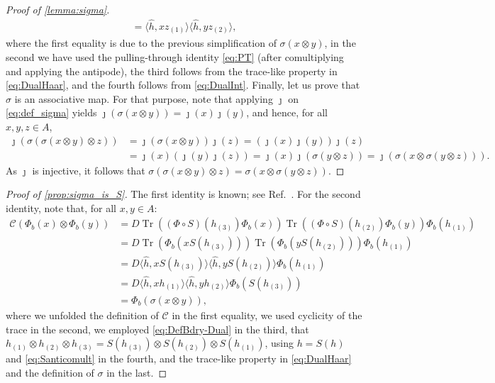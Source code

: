 \documentclass[a4paper,10pt]{amsart}
\newcommand{\Coarse}{\mathcal{C}}
\newcommand{\eval}[2]{\langle #1 , #2\rangle}
\theoremstyle{definition}
\begin{document}
\begin{proof}[Proof of \cref{lemma:sigma}]
\begin{align*}
    =
    \eval{\hat{h}}{x z_{(1)}}
    \eval{\hat{h}}{y z_{(2)}},
\end{align*}
where the first equality is due to the previous simplification of $\sigma(x\otimes y)$, in the second we have used the pulling-through identity \cref{eq:PT} (after comultiplying and applying the antipode), the third follows from the trace-like property in \cref{eq:DualHaar}, and the fourth follows from \cref{eq:DualInt}.
\smallbreak\noindent%
Finally, let us prove that $\sigma$ is an associative map. For that purpose, note that applying $\jmath$ on \cref{eq:def_sigma} yields
$
    \jmath(\sigma(x\otimes y)) = \jmath(x)\jmath(y)
$,
and hence, for all $x,y,z\in A$,
\begin{align*}
    \jmath (\sigma(\sigma(x\otimes y)\otimes z))
    &= \jmath(\sigma(x\otimes y))\jmath(z)
     = (\jmath(x)\jmath(y))\jmath(z) \\
    &= \jmath(x)(\jmath(y)\jmath(z))
     = \jmath(x)\jmath(\sigma(y\otimes z))
     = \jmath (\sigma(x\otimes \sigma(y\otimes z))).
\end{align*}
As $\jmath$ is injective, it follows that
$\sigma(\sigma(x\otimes y)\otimes z)=\sigma(x\otimes \sigma(y\otimes z))$.
\end{proof}

\begin{proof}[Proof of \cref{prop:sigma_is_S}]
The first identity is known; see Ref.~\cite[Theorem~3.2]{ruiz_matrix_2024}. For the second identity, note that, for all $x,y\in A$:
\begin{align*}
    \Coarse(\Phi_b(x)\otimes \Phi_b(y)) 
      &
    =
    D
    \operatorname{Tr}((\Phi\circ S)(h_{(3)}) \Phi_b(x) )
    \operatorname{Tr}((\Phi\circ S)(h_{(2)}) \Phi_b(y) ) 
    \Phi_b(h_{(1)})
    \\ &
    =
    D
    \operatorname{Tr}( \Phi_b(x S(h_{(3)})) )
    \operatorname{Tr}( \Phi_b(y S(h_{(2)})) ) 
    \Phi_b(h_{(1)})
    \\ &
    =
    D
    \eval{\hat{h}}{x S(h_{(3)})}
    \eval{\hat{h}}{y S(h_{(2)})}
    \Phi_b(h_{(1)})
    \\ &
    =
    D
    \eval{\hat{h}}{ x h_{(1)} }
    \eval{\hat{h}}{ y h_{(2)} }
    \Phi_b(S(h_{(3)}))
    \\ &
    =
    \Phi_b(\sigma( x \otimes y) ),
\end{align*}
where we unfolded the definition of $\Coarse$ in the first equality, we used cyclicity of the trace in the second, we employed \cref{eq:DefBdry-Dual} in the third, that
$h_{(1)}\otimes h_{(2)}\otimes h_{(3)} = S(h_{(3)})\otimes S(h_{(2)})\otimes S(h_{(1)})$,
using $h=S(h)$ and \cref{eq:Santicomult} in the fourth, and the trace-like property in \cref{eq:DualHaar} and the definition of $\sigma$ in the last.
\end{proof}
\end{document}
